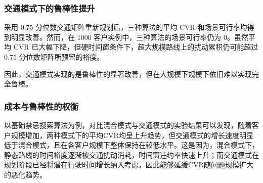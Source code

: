 \documentclass[12pt,a4paper,UTF8]{article}
\begin{document}
\subsubsection{交通模式下的鲁棒性提升}
\begin{table}[!htbp]
    \centering
    \caption{交通模式下三种启发式算法的鲁棒性评估结果}
    \label{tab:traffic_cvr_feasible_results}
\end{table}
采用 0.75 分位数交通矩阵重新规划后，三种算法的平均 CVR 和场景可行率均得到明显改善。然而，在 1000 客户实例中，三种算法的场景可行率仍为 0。虽然平均 CVR 已大幅下降，但硬时间窗条件下，超大规模路线上的扰动累积仍可能超过 0.75 分位数矩阵所预留的裕度。

因此，交通模式实现的是鲁棒性的显著改善，但在大规模下规模下依旧难以实现完全鲁棒。

\subsubsection{成本与鲁棒性的权衡}
以基础禁忌搜索算法为例，对比混合模式与交通模式的实验结果可以发现，随着客户规模增加，两种模式下的平均CVR均呈上升趋势，但交通模式的增长速度明显低于混合模式，且在各客户规模下整体保持在较低水平。这是因为，混合模式下，静态路线的时间裕度逐渐被交通扰动消耗，时间窗违约率快速上升；而交通模式在规划阶段已经将潜在行驶时间增长纳入考虑，因此能够延缓CVR随问题规模扩大的恶化趋势。
\end{document}
